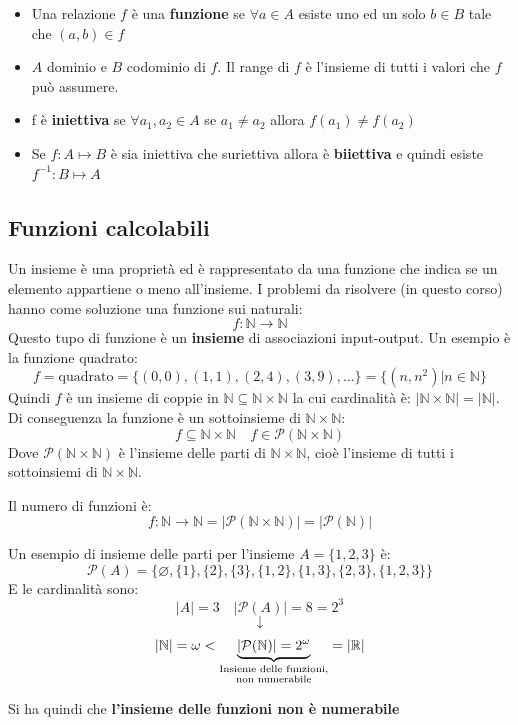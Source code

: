 \documentclass[a4paper]{article}
\begin{document}
\begin{itemize}
    \item Una relazione $f$ è una \textbf{funzione} se $\forall a \in A$ esiste uno ed un solo $b \in B$ tale che $(a,b) \in f$
    \item $A$ dominio e $B$ codominio di $f$. Il range di $f$ è l'insieme di tutti i valori che $f$ può assumere.
    \item f è \textbf{iniettiva} se $\forall a_1,a_2 \in A$ se $a_1 \neq a_2$ allora $f(a_1) \neq f(a_2)$
    \item Se $f : A \mapsto B$ è sia iniettiva che suriettiva allora è \textbf{biiettiva} e quindi esiste $f^{-1} : B \mapsto A$ 
\end{itemize}

\subsection{Funzioni calcolabili}
Un insieme è una proprietà ed è rappresentato da una funzione che indica se un elemento
appartiene o meno all'insieme. I problemi da risolvere (in questo corso) hanno come
soluzione una funzione sui naturali:
\[
  f : \mathbb{N} \to \mathbb{N}
\] 
Questo tupo di funzione è un \textbf{insieme} di associazioni input-output. Un esempio
è la funzione quadrato:
\[
  f = \text{quadrato} = \{(0,0), (1,1), (2,4), (3,9), \ldots\} = \{(n,n^2) | n \in \mathbb{N}\}
\] 
Quindi \( f \) è un insieme di coppie in \( \mathbb{N} \subseteq \mathbb{N} \times \mathbb{N} \) la
cui cardinalità è: \( \left| \mathbb{N} \times \mathbb{N} \right| =
\left| \mathbb{N} \right| \). Di conseguenza la funzione è un sottoinsieme di \( \mathbb{N}
\times \mathbb{N}\):
\[
  f \subseteq \mathbb{N} \times \mathbb{N} \quad f \in \mathcal{P}(\mathbb{N} \times \mathbb{N})
\] 
Dove \( \mathcal{P}(\mathbb{N} \times \mathbb{N}) \) è l'insieme delle parti di \( \mathbb{N}
\times \mathbb{N} \), cioè l'insieme di tutti i sottoinsiemi di \( \mathbb{N} \times
\mathbb{N} \).

Il numero di funzioni è:
\[
  f: \mathbb{N} \to \mathbb{N} = \left| \mathcal{P}(\mathbb{N} \times \mathbb{N}) \right| 
  = \left| \mathcal{P}(\mathbb{N}) \right| 
\] 
\begin{example}
  Un esempio di insieme delle parti per l'insieme \( A = \{1,2,3\} \) è:
  \[
    \mathcal{P}(A) = \{\varnothing, \{1\}, \{2\}, \{3\}, \{1,2\}, \{1,3\}, \{2,3\}, \{1,2,3\}\}
  \] 
  E le cardinalità sono:
  \[
    \left| A \right| = 3 \quad \left| \mathcal{P}(A) \right| = 8 = 2^3
  \] 
  \[
    \downarrow
  \] 
  \[
    \left| \mathbb{N} \right| = \omega < 
    \underbrace{\left| \mathcal{P}(\mathbb{N}) \right| = 2^{\omega}}_{%
      \substack{\text{Insieme delle funzioni,}\\ 
      \text{non numerabile}}
    }
    = \left| \mathbb{R} \right| 
  \] 
\end{example}
Si ha quindi che \textbf{l'insieme delle funzioni non è numerabile}
\end{document}
